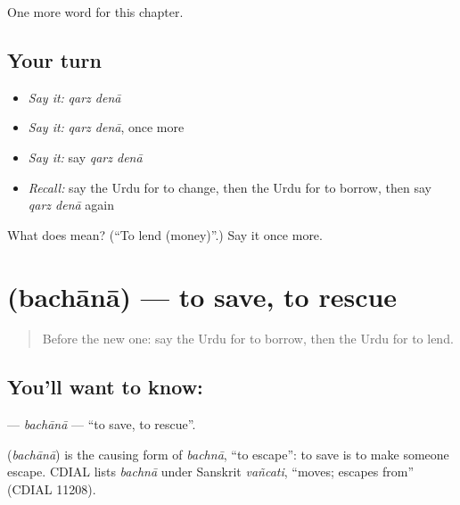 \begin{grammarlens}[title={What you've built}]
One more word for this chapter.
\end{grammarlens}

\subsection*{Your turn}
\begin{itemize}
\raggedright
  \item \emph{Say it:} \emph{qarz denā}
  \item \emph{Say it:} \emph{qarz denā}, once more
  \item \emph{Say it:} say \emph{qarz denā}
  \item \emph{Recall:} say the Urdu for to change, then the Urdu for to borrow, then say \emph{qarz denā} again
\end{itemize}

\begin{tcolorbox}[breakable,colback=teal!4,colframe=teal!35!black,title={Before you move on}]
What does   mean? (\textquotedblleft{}To lend (money)\textquotedblright{}.) Say it once more.
\end{tcolorbox}
\section[\texorpdfstring{\ur{بچانا} (bachānā)}{بچانا (bachānā)}]{ (bachānā) — to save, to rescue}

\label{lesson:UR-C148-bachana}



\begin{quote}
Before the new one: say the Urdu for to borrow, then the Urdu for to lend.
\end{quote}

\subsection*{You'll want to know: }
\textbf{} — \emph{bachānā} — \textquotedblleft{}to save, to rescue\textquotedblright{}.

\begin{cousinweb}
\textbf{} (\emph{bachānā}) is the causing form of \emph{bachnā}, \textquotedblleft{}to escape\textquotedblright{}: to save is to make someone escape. CDIAL lists \emph{bachnā} under Sanskrit \emph{vañcati}, \textquotedblleft{}moves; escapes from\textquotedblright{} (CDIAL 11208).
\end{cousinweb}

